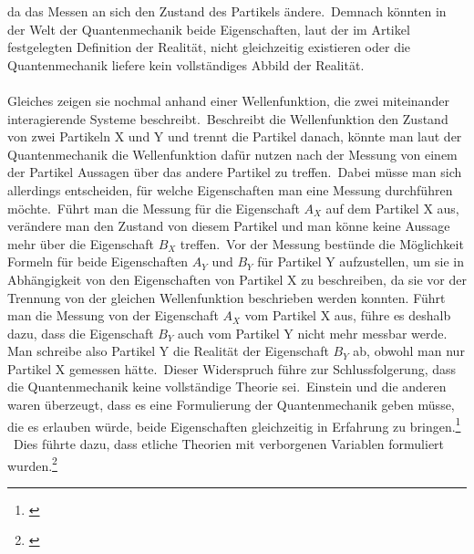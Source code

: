da das Messen an sich den Zustand des Partikels ändere.\ Demnach könnten in der Welt der Quantenmechanik beide Eigenschaften, laut der im Artikel festgelegten Definition der Realität, nicht gleichzeitig existieren oder die Quantenmechanik liefere kein vollständiges Abbild der Realität.\\\\
Gleiches zeigen sie nochmal anhand einer Wellenfunktion, die zwei miteinander interagierende Systeme beschreibt.\ Beschreibt die Wellenfunktion den Zustand von zwei Partikeln X und Y und trennt die Partikel danach, könnte man laut der Quantenmechanik die Wellenfunktion dafür nutzen nach der Messung von einem der Partikel Aussagen über das andere Partikel zu treffen.\ Dabei müsse man sich allerdings entscheiden, für welche Eigenschaften man eine Messung durchführen möchte.\ Führt man die Messung für die Eigenschaft $A_X$ auf dem Partikel X aus, verändere man den Zustand von diesem Partikel und man könne keine Aussage mehr über die Eigenschaft $B_X$ treffen.\ Vor der Messung bestünde die Möglichkeit Formeln für beide Eigenschaften $A_Y$ und $B_Y$ für Partikel Y aufzustellen, um sie in Abhängigkeit von den Eigenschaften von Partikel X zu beschreiben, da sie vor der Trennung von der gleichen Wellenfunktion beschrieben werden konnten. Führt man die Messung von der Eigenschaft $A_X$ vom Partikel X aus, führe es deshalb dazu, dass die Eigenschaft $B_Y$ auch vom Partikel Y nicht mehr messbar werde. Man schreibe also Partikel Y die Realität der Eigenschaft $B_Y$ ab, obwohl man nur Partikel X gemessen hätte.\ Dieser Widerspruch führe zur Schlussfolgerung, dass die Quantenmechanik keine vollständige Theorie sei.\ Einstein und die anderen waren überzeugt, dass es eine Formulierung der Quantenmechanik geben müsse, die es erlauben würde, beide Eigenschaften gleichzeitig in Erfahrung zu bringen.\footnote{\cite{erp_1935}}
\ Dies führte dazu, dass etliche Theorien mit verborgenen Variablen formuliert wurden.\footnote{\cite{sep-qm-copenhagen}} \\

